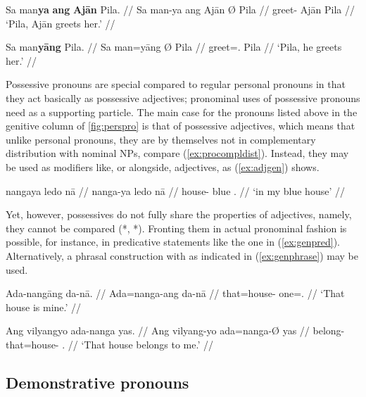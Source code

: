 \pex
\a\begingl
	\gla Sa man\textbf{ya} \textbf{ang} \textbf{Ajān} {} Pila. //
	\glb Sa man-ya ang ​Ajān Ø ​Pila //
	\glc \PatT{} greet-\TsgM{} \Aarg{} ​Ajān \Top{} ​Pila //
	\glft `Pila, Ajān greets her.' //
\endgl

\a\begingl
	\gla Sa man\textbf{yāng} {} Pila. //
	\glb Sa man=yāng Ø ​Pila //
	\glc \PatT{} greet=\TsgM{}.\Aarg{} \Top{} Pila //
	\glft `Pila, he greets her.' //
\endgl
\xe



Possessive pronouns are special compared to regular personal pronouns in that
they act basically as possessive adjectives; pronominal uses of possessive
pronouns need  as a supporting particle. The main case for the
pronouns listed above in the genitive column of \autoref{fig:perspro} is that
of possessive adjectives, which means that unlike personal pronouns, they are
by themselves not in complementary distribution with nominal NPs, compare
(\ref{ex:procompldist}). Instead, they may be used as modifiers like, or
alongside, adjectives, as (\ref{ex:adjgen}) shows.

\ex\label{ex:adjgen}
\begingl
	\gla nangaya ledo nā //
	\glb nanga-ya ledo nā //
	\glc house-\Loc{} blue \Fsg{}.\Gen{} //
	\glft `in my blue house' //
\endgl
\xe

Yet, however, possessives do not fully share the properties of adjectives,
namely, they cannot be compared (*,
*). Fronting them in actual pronominal fashion is
possible, for instance, in predicative statements like the one in
(\ref{ex:genpred}). Alternatively, a phrasal construction with
 as indicated in (\ref{ex:genphrase}) may be 
used.

\pex
\a\label{ex:genpred}\begingl
	\gla Ada-nangāng da-nā. //
	\glb Ada=nanga-ang da-nā //
	\glc that=house-\Aarg{} one=\Fsg{}.\Gen{} //
	\glft `That house is mine.' //
\endgl

\a\label{ex:genphrase}\begingl
	\gla Ang vilyangyo ada-nanga yas. //
	\glb Ang vilyang-yo ada=nanga-Ø yas //
	\glc \AgtT{} belong-\TsgN{} that=house-\Top{} \Fsg{}.\Parg{} //
	\glft `That house belongs to me.' //
\endgl
\xe


\subsection{Demonstrative pronouns}
\label{subsec:dempro}

